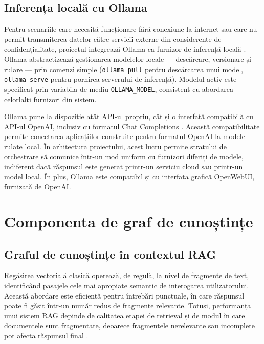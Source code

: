 \documentclass[12pt, a4paper, oneside, romanian]{teza-upb}
\begin{document}
\subsection{Inferența locală cu Ollama}

Pentru scenariile care necesită funcționare fără conexiune la internet sau care 
nu permit transmiterea datelor către servicii externe din considerente de 
confidențialitate, proiectul integrează Ollama ca furnizor de inferență locală 
\cite{ollama_doc}. Ollama abstractizează gestionarea modelelor locale — 
descărcare, versionare și rulare — prin comenzi simple (\texttt{ollama pull} 
pentru descărcarea unui model, \texttt{ollama serve} pentru pornirea serverului 
de inferență). Modelul activ este specificat prin variabila de mediu 
\texttt{OLLAMA\_MODEL}, consistent cu abordarea celorlalți furnizori din sistem.


Ollama pune la dispoziție atât API-ul propriu, cât și o interfață compatibilă cu API-ul OpenAI, inclusiv cu formatul Chat Completions \cite{ollama_openai_compatibility}. Această compatibilitate permite conectarea aplicațiilor construite pentru formatul OpenAI la modele rulate local. În arhitectura proiectului, acest lucru permite stratului de orchestrare să comunice într-un mod uniform cu furnizori diferiți de modele, indiferent dacă răspunsul este generat printr-un serviciu cloud sau printr-un model local. În plus, Ollama este compatibil și cu interfața grafică OpenWebUI, furnizată de OpenAI.

\section{Componenta de graf de cunoștințe}

\subsection{Graful de cunoștințe în contextul RAG}

Regăsirea vectorială clasică operează, de regulă, la nivel de fragmente de text, identificând pasajele cele mai apropiate semantic de interogarea utilizatorului. Această abordare este eficientă pentru întrebări punctuale, în care răspunsul poate fi găsit într-un număr redus de fragmente relevante. Totuși, performanța unui sistem RAG depinde de calitatea etapei de retrieval și de modul în care documentele sunt fragmentate, deoarece fragmentele nerelevante sau incomplete pot afecta răspunsul final \cite{gao2023retrieval}.
\end{document}
